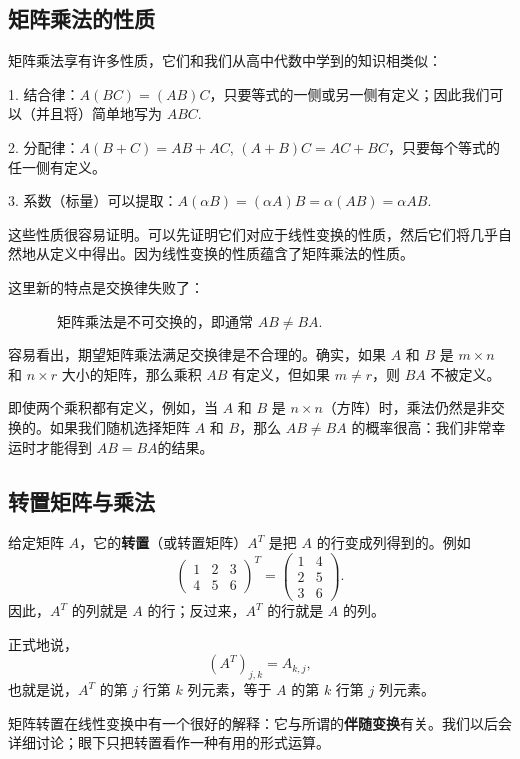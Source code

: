 \subsection{矩阵乘法的性质}\label{sec:01-05-03}

矩阵乘法享有许多性质，它们和我们从高中代数中学到的知识相类似：

1. 结合律：$A(BC) = (AB)C$，只要等式的一侧或另一侧有定义；因此我们可以（并且将）简单地写为 $ABC$.~

2. 分配律：$A(B + C) = AB + AC$, $(A + B)C = AC + BC$，只要每个等式的任一侧有定义。

3. 系数（标量）可以提取：$A(\alpha B) = (\alpha A) B = \alpha (AB) = \alpha AB$.

这些性质很容易证明。可以先证明它们对应于线性变换的性质，然后它们将几乎自然地从定义中得出。因为线性变换的性质蕴含了矩阵乘法的性质。

这里新的特点是交换律失败了：

~~~~~~~矩阵乘法是不可交换的，即通常 $AB \neq BA$.~

容易看出，期望矩阵乘法满足交换律是不合理的。确实，如果 $A$ 和 $B$ 是 $m \times n$ 和 $n \times r$ 大小的矩阵，那么乘积 $AB$ 有定义，但如果 $m \neq r$，则 $BA$ 不被定义。

即使两个乘积都有定义，例如，当 $A$ 和 $B$ 是 $n \times n$（方阵）时，乘法仍然是非交换的。如果我们随机选择矩阵 $A$ 和 $B$，那么 $AB \neq BA$ 的概率很高：我们非常幸运时才能得到 $AB = BA$的结果。

\subsection{转置矩阵与乘法}\label{sec:01-05-04}

给定矩阵 $A$，它的\textbf{转置}（或转置矩阵）$A^T$ 是把 $A$ 的行变成列得到的。例如
$$
\begin{pmatrix}1&2&3\\4&5&6\end{pmatrix}^{T}
=
\begin{pmatrix}1&4\\2&5\\3&6\end{pmatrix}.
$$
因此，$A^T$ 的列就是 $A$ 的行；反过来，$A^T$ 的行就是 $A$ 的列。

正式地说，
$$(A^T)_{j,k}=A_{k,j},$$
也就是说，$A^T$ 的第 $j$ 行第 $k$ 列元素，等于 $A$ 的第 $k$ 行第 $j$ 列元素。

矩阵转置在线性变换中有一个很好的解释：它与所谓的\textbf{伴随变换}有关。我们以后会详细讨论；眼下只把转置看作一种有用的形式运算。

